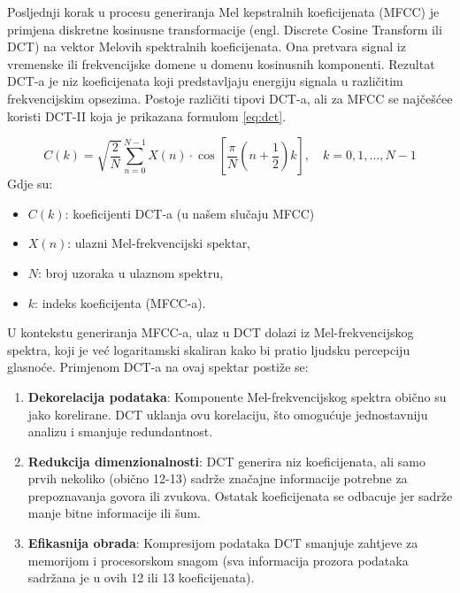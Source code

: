 Posljednji korak u procesu generiranja Mel kepstralnih koeficijenata (MFCC) je primjena diskretne
kosinusne transformacije (engl. Discrete Cosine Transform ili DCT) na vektor Melovih spektralnih
koeficijenata. Ona pretvara signal iz vremenske ili frekvencijske domene u 
domenu kosinusnih komponenti. Rezultat DCT-a je niz koeficijenata koji predstavljaju energiju 
signala u različitim frekvencijskim opsezima. 
Postoje različiti tipovi DCT-a, ali za MFCC se najčešćee koristi DCT-II koja je prikazana
formulom \ref{eq:dct}.

\begin{equation}
    \label{eq:dct}
    C(k) = \sqrt{\frac{2}{N}} \sum_{n=0}^{N-1} X(n) \cdot \cos\left[ \frac{\pi}{N} \left(n + \frac{1}{2}\right) k \right], \quad k = 0, 1, \dots, N-1
\end{equation}
Gdje su:
\begin{itemize}
\item $C(k)$: koeficijenti DCT-a (u našem slučaju MFCC)
\item $X(n)$: ulazni Mel-frekvencijski spektar,
\item $N$: broj uzoraka u ulaznom spektru,
\item $k$: indeks koeficijenta (MFCC-a).
\end{itemize}

U kontekstu generiranja MFCC-a, ulaz u DCT dolazi iz Mel-frekvencijskog spektra, koji je već 
logaritamski skaliran kako bi pratio ljudsku percepciju glasnoće. Primjenom DCT-a na ovaj spektar 
postiže se:

\begin{enumerate}
\item \textbf{Dekorelacija podataka}: Komponente Mel-frekvencijskog spektra obično su jako 
korelirane. DCT uklanja ovu korelaciju, što omogućuje jednostavniju analizu i smanjuje
redundantnost.

\item \textbf{Redukcija dimenzionalnosti}: DCT generira niz koeficijenata, ali samo prvih
nekoliko (obično 12-13) sadrže značajne informacije potrebne za prepoznavanja govora ili zvukova. 
Ostatak koeficijenata se odbacuje jer sadrže manje bitne informacije ili šum.

\item \textbf{Efikasnija obrada}: Kompresijom podataka DCT smanjuje zahtjeve za memorijom i 
procesorskom snagom (sva informacija prozora podataka sadržana je u ovih 12 ili 13 koeficijenata).
\end{enumerate}


